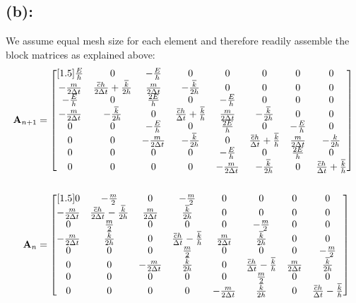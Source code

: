\subsection*{(b): }
We assume equal mesh size for each element and therefore readily assemble the block matrices as explained above: 
\begin{align*}
{\bf A}_{n+1}
& =
\begin{bmatrix}[1.5]
\frac{E}{h} & 0 & -\frac{E}{h} & 0 & 0 & 0 & 0 & 0\\
-\frac{m}{2\Delta t} & \frac{\overline{c}h}{2\Delta t}+ \frac{\overline{k}}{2h} & \frac{m}{2\Delta t} & -\frac{\overline{k}}{2h} & 0 & 0 & 0 & 0 \\
-\frac{E}{h} & 0 & \frac{2E}{h} & 0 & -\frac{E}{h} & 0 & 0 & 0 \\
- \frac{m}{2\Delta t} & - \frac{\overline{k}}{2h} & 0 & \frac{\overline{c}h}{\Delta t} + \frac{\overline{k}}{h} & \frac{m}{2\Delta t} & -\frac{\overline{k}}{2h} & 0 & 0 \\
0 & 0 & -\frac{E}{h} & 0 & \frac{2E}{h} & 0 & -\frac{E}{h} & 0 \\
0 & 0 & -\frac{m}{2\Delta t} & -\frac{\overline{k}}{2h} & 0 & \frac{\overline{c}h}{\Delta t} + \frac{\overline{k}}{h} & \frac{m}{2\Delta t} & -\frac{k}{2h} \\
0 & 0 & 0 & 0 & -\frac{E}{h} & 0 & \frac{2E}{h} & 0 \\
0 & 0 & 0 & 0 & -\frac{m}{2\Delta t} & -\frac{\overline{k}}{2h} & 0 & \frac{\overline{c}h}{\Delta t} + \frac{\overline{k}}{h}
\end{bmatrix} \\ \\
{\bf A}_n
& =
\begin{bmatrix}[1.5]
0 & -\frac{m}{2} & 0 & -\frac{m}{2} & 0 & 0 & 0 & 0\\
-\frac{m}{2\Delta t} & \frac{\overline{c}h}{2\Delta t}-\frac{\overline{k}}{2h} & \frac{m}{2\Delta t} & \frac{\overline{k}}{2h}  & 0 & 0 & 0 & 0\\
0 & \frac{m}{2} & 0 & 0 & 0 & -\frac{m}{2} & 0 & 0\\
- \frac{m}{2\Delta t} & \frac{\overline{k}}{2h} &  0 & \frac{\overline{c}h}{\Delta t}- \frac{\overline{k}}{h} & \frac{m}{2\Delta t} & \frac{\overline{k}}{2h}  & 0 & 0\\
0 & 0 & 0 & \frac{m}{2} & 0 & 0 & 0 & -\frac{m}{2}\\
0 & 0 & -\frac{m}{2\Delta t} & \frac{\overline{k}}{2h} & 0 & \frac{\overline{c}h}{\Delta t}- \frac{\overline{k}}{h} & \frac{m}{2\Delta t} & \frac{\overline{k}}{2h} \\
0 & 0 & 0 & 0 & 0 & \frac{m}{2} & 0 & 0 \\
0 & 0 & 0 & 0 & -\frac{m}{2\Delta t } & \frac{\overline{k}}{2h} & 0 & \frac{\overline{c}h}{\Delta t}- \frac{\overline{k}}{h}
\end{bmatrix}
\end{align*}
